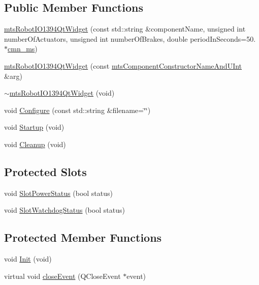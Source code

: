 \subsection*{Public Member Functions}
\begin{DoxyCompactItemize}
\item 
\hyperlink{classmts_robot_i_o1394_qt_widget_a543c42d3fa7318d97d89c1936d5ca743}{mts\+Robot\+I\+O1394\+Qt\+Widget} (const std\+::string \&component\+Name, unsigned int number\+Of\+Actuators, unsigned int number\+Of\+Brakes, double period\+In\+Seconds=50. $\ast$\hyperlink{cmn_units_8h_aaf4d3f2fafb9b4a95606544b9d876b4a}{cmn\+\_\+ms})
\item 
\hyperlink{classmts_robot_i_o1394_qt_widget_aeaf28b08e36f26be20223307eeb48271}{mts\+Robot\+I\+O1394\+Qt\+Widget} (const \hyperlink{mts_component_8h_aa605f54730dc942fd5d3b0419fbb1aa8}{mts\+Component\+Constructor\+Name\+And\+U\+Int} \&arg)
\item 
\hyperlink{classmts_robot_i_o1394_qt_widget_a072d12c4c0a44fe3aafb5c9d1ae66926}{$\sim$mts\+Robot\+I\+O1394\+Qt\+Widget} (void)
\item 
void \hyperlink{classmts_robot_i_o1394_qt_widget_abcdf2ec519494dbf0917d2e4360ddf73}{Configure} (const std\+::string \&filename=\char`\"{}\char`\"{})
\item 
void \hyperlink{classmts_robot_i_o1394_qt_widget_a4f09cb9747549dba97bd03445f40dfcb}{Startup} (void)
\item 
void \hyperlink{classmts_robot_i_o1394_qt_widget_ac30591b633ede4a45f9742edd6d8c590}{Cleanup} (void)
\end{DoxyCompactItemize}
\subsection*{Protected Slots}
\begin{DoxyCompactItemize}
\item 
void \hyperlink{classmts_robot_i_o1394_qt_widget_ac326195caa3410254aab44d0a96f46a8}{Slot\+Power\+Status} (bool status)
\item 
void \hyperlink{classmts_robot_i_o1394_qt_widget_a1eefb335b7779916e02d81d587b2a62a}{Slot\+Watchdog\+Status} (bool status)
\end{DoxyCompactItemize}
\subsection*{Protected Member Functions}
\begin{DoxyCompactItemize}
\item 
void \hyperlink{classmts_robot_i_o1394_qt_widget_a09359bcaa8d312cbc1ca6bc440a3d6b0}{Init} (void)
\item 
virtual void \hyperlink{classmts_robot_i_o1394_qt_widget_af8e5a4c1a6483729693c0067a044e6c2}{close\+Event} (Q\+Close\+Event $\ast$event)
\end{DoxyCompactItemize}
